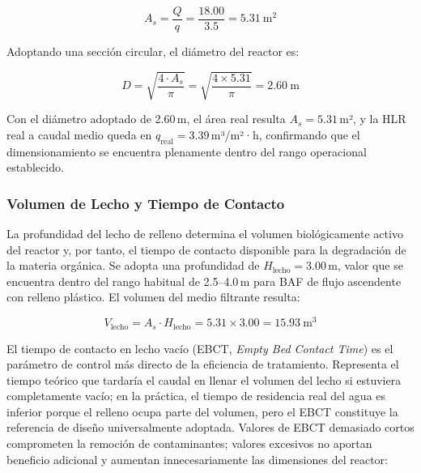 \documentclass[12pt,a4paper]{article}
\newcommand{\captionequation}[1]{\vspace{-0.5em}\caption*{#1}\vspace{0.5em}}
\begin{document}
\begin{equation}
A_{s} = \frac{Q}{q} = \frac{18.00}{3.5} = 5.31\ \text{m}^2
\end{equation}
\captionequation{Área superficial del BAF por criterio HLR}

Adoptando una sección circular, el diámetro del reactor es:

\begin{equation}
D = \sqrt{\frac{4 \cdot A_{s}}{\pi}} = \sqrt{\frac{4 \times 5.31}{\pi}} = 2.60\ \text{m}
\end{equation}
\captionequation{Diámetro del reactor BAF}

Con el diámetro adoptado de 2.60\,m, el área real resulta $A_{s} = 5.31$\,m², y la HLR real a caudal medio queda en $q_{\text{real}} = 3.39$\,m³/m²·h, confirmando que el dimensionamiento se encuentra plenamente dentro del rango operacional establecido.

\subsubsection*{Volumen de Lecho y Tiempo de Contacto}

La profundidad del lecho de relleno determina el volumen biológicamente activo del reactor y, por tanto, el tiempo de contacto disponible para la degradación de la materia orgánica. Se adopta una profundidad de $H_{\text{lecho}} = 3.00$\,m, valor que se encuentra dentro del rango habitual de 2.5--4.0\,m para BAF de flujo ascendente con relleno plástico. El volumen del medio filtrante resulta:

\begin{equation}
V_{\text{lecho}} = A_{s} \cdot H_{\text{lecho}} = 5.31 \times 3.00 = 15.93\ \text{m}^3
\end{equation}
\captionequation{Volumen del lecho de relleno}

El tiempo de contacto en lecho vacío (EBCT, \textit{Empty Bed Contact Time}) es el parámetro de control más directo de la eficiencia de tratamiento. Representa el tiempo teórico que tardaría el caudal en llenar el volumen del lecho si estuviera completamente vacío; en la práctica, el tiempo de residencia real del agua es inferior porque el relleno ocupa parte del volumen, pero el EBCT constituye la referencia de diseño universalmente adoptada. Valores de EBCT demasiado cortos comprometen la remoción de contaminantes; valores excesivos no aportan beneficio adicional y aumentan innecesariamente las dimensiones del reactor:
\end{document}
